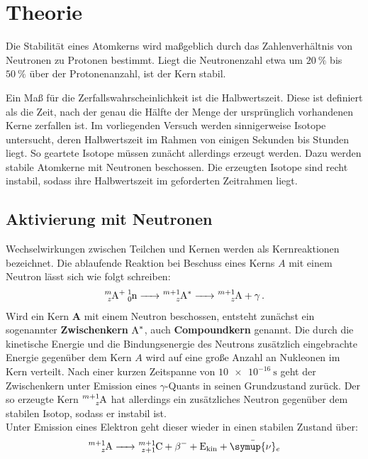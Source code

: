 \section{Theorie}
\label{sec:Theorie}
Die Stabilität eines Atomkerns wird maßgeblich durch das Zahlenverhältnis von Neutronen zu Protonen bestimmt. Liegt die Neutronenzahl etwa um $\SI{20}{\percent}$ bis $\SI{50}{\percent}$ über der Protonenanzahl, ist der Kern stabil.

Ein Maß für die Zerfallswahrscheinlichkeit ist die Halbwertszeit. Diese ist definiert als die Zeit, nach der genau die Hälfte der Menge der ursprünglich vorhandenen Kerne zerfallen ist.
Im vorliegenden Versuch werden sinnigerweise Isotope untersucht, deren Halbwertszeit im Rahmen von einigen Sekunden bis Stunden liegt.
So geartete Isotope müssen zunächt allerdings erzeugt werden. Dazu werden stabile Atomkerne mit Neutronen beschossen. Die erzeugten Isotope sind recht instabil, sodass ihre Halbwertszeit im geforderten Zeitrahmen liegt.


\subsection{Aktivierung mit Neutronen}
Wechselwirkungen zwischen Teilchen und Kernen werden als Kernreaktionen bezeichnet.
Die ablaufende Reaktion bei Beschuss eines Kerns $A$ mit einem Neutron lässt sich wie folgt schreiben:
\begin{align}
	\ce{^{m}_{z}A+ ^{1}_0n -> ^{m+1}_zA^{*} -> ^{m+1}_zA +\gamma} \, \mathrm{.}
\end{align}
Wird ein Kern \textbf{A} mit einem Neutron beschossen, entsteht zunächst ein sogenannter \textbf{Zwischenkern} $\ce{A^{*}}$, auch \textbf{Compoundkern} genannt. Die durch die kinetische Energie und die Bindungsenergie des Neutrons zusätzlich eingebrachte Energie gegenüber dem Kern $A$  wird auf eine große Anzahl an Nukleonen im Kern verteilt.
Nach einer kurzen Zeitspanne von $\SI{10e-16}{\second}$ geht der Zwischenkern unter Emission eines $\gamma$-Quants in seinen Grundzustand zurück.
Der so erzeugte Kern $\ce{^{m+1}_zA }$ hat allerdings ein zusätzliches Neutron gegenüber dem stabilen Isotop, sodass er instabil ist.\\
Unter Emission eines Elektron geht dieser wieder in einen stabilen Zustand über:
\begin{align*}
\ce{^{m+1}_zA -> ^{m+1}_{z+1}C +\beta ^{-} + E_{\mathrm{kin }} + \bar{\symup{\nu}}_e}
\end{align*}


